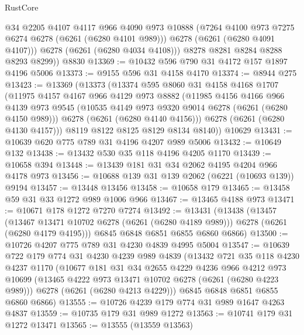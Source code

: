 \begin{lexlean}{RustCore}
\begin{coremodule}
            @34
            @2205
            @4107
            @4117
            @966
            @4090
            @973
            @10888
            (@7264 @4100 @973 @7275 @6274 @6278 (@6261 (@6280 @4101 @989)))
            @6278
            (@6261 (@6280 @4091 @4107)))
          @6278
          (@6261 (@6280 @4034 @4108)))
        @8278
        @8281
        @8284
        @8288
        @8293
        @8299))
    @8830
@13369 := @10432 @596 @790 @31 @4172 @157 @1897 @4196 @5006
@13373 := @9155 @596 @31 @4158 @4170
@13374 := @8944 @275
@13423 := @13369
    (@13373
      (@13374
        @595
        @8060
        @31
        @4158
        @4168
        @1707
        (@11975
          @4157
          @4167
          @966
          @4129
          @973
          @8882
          (@11985
            @4156
            @4166
            @966
            @4139
            @973
            @9545
            (@10535 @4149 @973 @9320 @9014 @6278 (@6261 (@6280 @4150 @989)))
            @6278
            (@6261 (@6280 @4140 @4156)))
          @6278
          (@6261 (@6280 @4130 @4157)))
        @8119
        @8122
        @8125
        @8129
        @8134
        @8140))
    @10629
@13431 := @10639 @620 @775 @789 @31 @4196 @4207 @989 @5006
@13432 := @10649 @132
@13438 := @13432 @530 @35 @118 @4196 @4205 @1170
@13439 := @10658 @394
@13448 := @13439 @181 @31 @34 @2062 @4195 @4204 @966 @4178 @973
@13456 := @10688 @139 @31 @139 @2062 (@6221 (@10693 @139)) @9194
@13457 := @13448 @13456
@13458 := @10658 @179
@13465 := @13458 @59 @31 @33 @1272 @989 @1006 @966
@13467 := @13465 @4188 @973
@13471 := @10671 @178 @1272 @7270 @7274
@13492 := @13431
    (@13438
      (@13457
        (@13467 @13471 @10702 @6278 (@6261 (@6280 @4189 @989)))
        @6278
        (@6261 (@6280 @4179 @4195)))
      @6845
      @6848
      @6851
      @6855
      @6860
      @6866)
@13500 := @10726 @4207 @775 @789 @31 @4230 @4839 @4995 @5004
@13547 := @10639
    @722
    @179
    @774
    @31
    @4230
    @4239
    @989
    @4839
    (@13432
      @721
      @35
      @118
      @4230
      @4237
      @1170
      (@10677
        @181
        @31
        @34
        @2655
        @4229
        @4236
        @966
        @4212
        @973
        @10699
        (@13465 @4222 @973 @13471 @10702 @6278 (@6261 (@6280 @4223 @989)))
        @6278
        (@6261 (@6280 @4213 @4229)))
      @6845
      @6848
      @6851
      @6855
      @6860
      @6866)
@13555 := @10726 @4239 @179 @774 @31 @989 @1647 @4263 @4837
@13559 := @10735 @179 @31 @989 @1272
@13563 := @10741 @179 @31 @1272 @13471
@13565 := @13555 (@13559 @13563)

\end{coremodule}
\end{lexlean}
